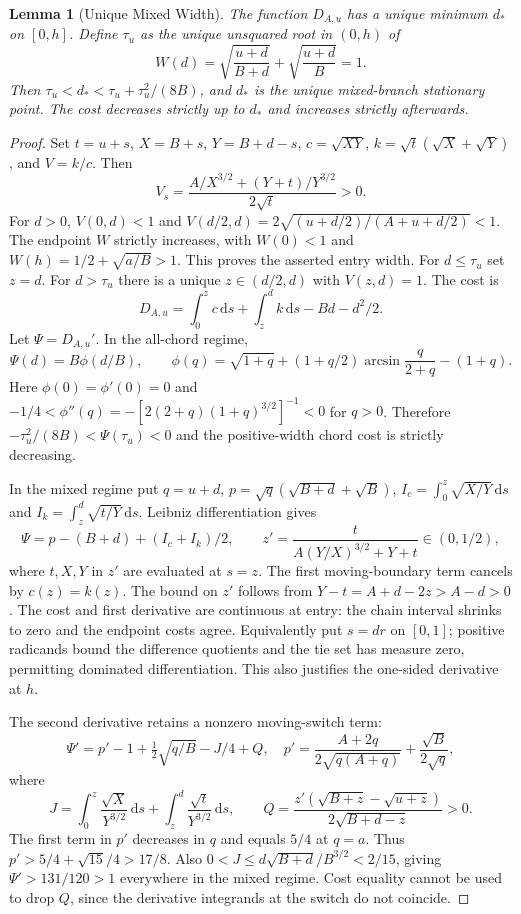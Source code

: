 \documentclass[11pt,letterpaper]{article}
\newtheorem{lemma}[theorem]{Lemma}
\newcommand{\dd}{\,\mathrm d}
\begin{document}
\begin{lemma}[Unique Mixed Width]\label{lem:width}
The function $D_{A,u}$ has a unique minimum $d_*$ on $[0,h]$.
Define $\tau_u$ as the unique unsquared root in $(0,h)$ of
\[
 W(d)=\sqrt{\frac{u+d}{B+d}}+\sqrt{\frac{u+d}B}=1.
\]
Then $\tau_u<d_*<\tau_u+\tau_u^2/(8B)$, and $d_*$ is the unique
mixed-branch stationary point. The cost decreases strictly up to $d_*$
and increases strictly afterwards.
\end{lemma}
\begin{proof}
Set $t=u+s$, $X=B+s$, $Y=B+d-s$, $c=\sqrt{XY}$,
$k=\sqrt t(\sqrt X+\sqrt Y)$, and $V=k/c$.
Then
\[
 V_s=\frac{A/X^{3/2}+(Y+t)/Y^{3/2}}{2\sqrt t}>0.
\]
For $d>0$, $V(0,d)<1$ and
$V(d/2,d)=2\sqrt{(u+d/2)/(A+u+d/2)}<1$.
The endpoint $W$ strictly increases, with $W(0)<1$ and
$W(h)=1/2+\sqrt{a/B}>1$. This proves the asserted entry width.
For $d\le\tau_u$ set $z=d$. For $d>\tau_u$ there is a unique
$z\in(d/2,d)$ with $V(z,d)=1$. The cost is
\[
 D_{A,u}=\int_0^z c\dd s+\int_z^d k\dd s-Bd-d^2/2.
\]
Let $\Psi=D_{A,u}'$. In the all-chord regime,
\[
 \Psi(d)=B\phi(d/B),\qquad
 \phi(q)=\sqrt{1+q}+(1+q/2)\arcsin\frac q{2+q}-(1+q).
\]
Here $\phi(0)=\phi'(0)=0$ and
$-1/4<\phi''(q)=-[2(2+q)(1+q)^{3/2}]^{-1}<0$ for $q>0$.
Therefore $-\tau_u^2/(8B)<\Psi(\tau_u)<0$ and the positive-width
chord cost is strictly decreasing.

In the mixed regime put $q=u+d$,
$p=\sqrt q(\sqrt{B+d}+\sqrt B)$,
$I_c=\int_0^z\sqrt{X/Y}\dd s$ and $I_k=\int_z^d\sqrt{t/Y}\dd s$.
Leibniz differentiation gives
\begin{equation}\label{eq:Psi}
 \Psi=p-(B+d)+(I_c+I_k)/2,\qquad
 z'=\frac{t}{A(Y/X)^{3/2}+Y+t}\in(0,1/2),
\end{equation}
where $t,X,Y$ in $z'$ are evaluated at $s=z$.
The first moving-boundary term cancels by $c(z)=k(z)$.
The bound on $z'$ follows from $Y-t=A+d-2z>A-d>0$.
The cost and first derivative are continuous at entry: the chain interval
shrinks to zero and the endpoint costs agree. Equivalently put $s=dr$
on $[0,1]$; positive radicands bound the difference quotients and the tie
set has measure zero, permitting dominated differentiation. This also
justifies the one-sided derivative at $h$.

The second derivative retains a nonzero moving-switch term:
\begin{equation}\label{eq:Psiprime}
 \Psi'=p'-1+\tfrac12\sqrt{q/B}-J/4+Q,
 \quad p'=\frac{A+2q}{2\sqrt{q(A+q)}}+\frac{\sqrt B}{2\sqrt q},
\end{equation}
where
\[
 J=\int_0^z\frac{\sqrt X}{Y^{3/2}}\dd s+
       \int_z^d\frac{\sqrt t}{Y^{3/2}}\dd s,
 \qquad Q=\frac{z'(\sqrt{B+z}-\sqrt{u+z})}{2\sqrt{B+d-z}}>0.
\]
The first term in $p'$ decreases in $q$ and equals $5/4$ at $q=a$.
Thus $p'>5/4+\sqrt{15}/4>17/8$.
Also $0<J\le d\sqrt{B+d}/B^{3/2}<2/15$, giving
$\Psi'>131/120>1$ everywhere in the mixed regime.
Cost equality cannot be used to drop $Q$, since the derivative integrands
at the switch do not coincide.


\end{proof}
\end{document}
